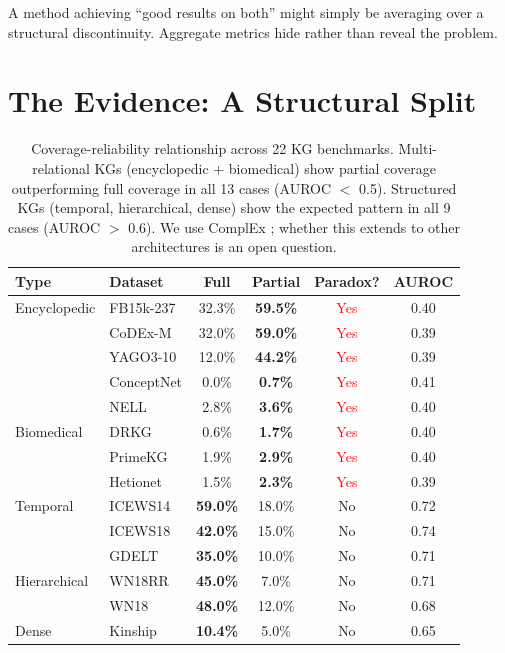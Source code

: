 \documentclass{article}
\begin{document}
A method achieving ``good results on both'' might simply be averaging over a structural discontinuity. Aggregate metrics hide rather than reveal the problem.

\section{The Evidence: A Structural Split}

\begin{table}[t]
\centering
\caption{Coverage-reliability relationship across 22 KG benchmarks. Multi-relational KGs (encyclopedic + biomedical) show partial coverage outperforming full coverage in all 13 cases (AUROC $<$ 0.5). Structured KGs (temporal, hierarchical, dense) show the expected pattern in all 9 cases (AUROC $>$ 0.6). We use ComplEx \citep{trouillon2016complex}; whether this extends to other architectures is an open question.}
\label{tab:main}
\small
\begin{tabular}{llcccc}
\toprule
\textbf{Type} & \textbf{Dataset} & \textbf{Full} & \textbf{Partial} & \textbf{Paradox?} & \textbf{AUROC} \\
\midrule
Encyclopedic & FB15k-237 & 32.3\% & \textbf{59.5\%} & \textcolor{red}{Yes} & 0.40 \\
& CoDEx-M & 32.0\% & \textbf{59.0\%} & \textcolor{red}{Yes} & 0.39 \\
& YAGO3-10 & 12.0\% & \textbf{44.2\%} & \textcolor{red}{Yes} & 0.39 \\
& ConceptNet & 0.0\% & \textbf{0.7\%} & \textcolor{red}{Yes} & 0.41 \\
& NELL & 2.8\% & \textbf{3.6\%} & \textcolor{red}{Yes} & 0.40 \\
\midrule
Biomedical & DRKG & 0.6\% & \textbf{1.7\%} & \textcolor{red}{Yes} & 0.40 \\
& PrimeKG & 1.9\% & \textbf{2.9\%} & \textcolor{red}{Yes} & 0.40 \\
& Hetionet & 1.5\% & \textbf{2.3\%} & \textcolor{red}{Yes} & 0.39 \\
\midrule
Temporal & ICEWS14 & \textbf{59.0\%} & 18.0\% & No & 0.72 \\
& ICEWS18 & \textbf{42.0\%} & 15.0\% & No & 0.74 \\
& GDELT & \textbf{35.0\%} & 10.0\% & No & 0.71 \\
\midrule
Hierarchical & WN18RR & \textbf{45.0\%} & 7.0\% & No & 0.71 \\
& WN18 & \textbf{48.0\%} & 12.0\% & No & 0.68 \\
\midrule
Dense & Kinship & \textbf{10.4\%} & 5.0\% & No & 0.65 \\
\bottomrule
\end{tabular}
\end{table}
\end{document}
